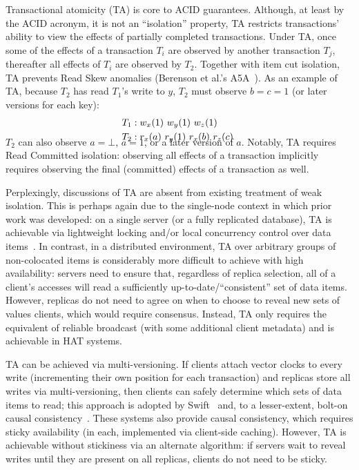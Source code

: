 Transactional atomicity (TA) is core to ACID guarantees. Although, at
least by the ACID acronym, it is not an ``isolation'' property, TA
restricts transactions' ability to view the effects of partially
completed transactions. Under TA, once some of the effects of a
transaction $T_i$ are observed by another transaction $T_j$,
thereafter all effects of $T_i$ are observed by $T_2$. Together with
item cut isolation, TA prevents Read Skew anomalies (Berenson et al.'s
A5A~\cite{ansicritique}). As an example of TA, because $T_2$ has read
$T_1$'s write to $y$, $T_2$ must observe $b=c=1$ (or later versions
for each key):
\vspace{-.5em}
\begin{align*}
\small
T_1 &: w_x(1)~w_y(1)~w_z(1)
\\T_2 &: r_x(a)~r_y(1)~r_x(b)~r_z(c)~\\[-1.5em]
\end{align*}
$T_2$ can also observe $a=\bot$, $a=1$, or a later version of
$a$. Notably, TA requires Read Committed isolation: observing all
effects of a transaction implicitly requires observing the final
(committed) effects of a transaction as well.

Perplexingly, discussions of TA are absent from existing treatment of
weak isolation. This is perhaps again due to the single-node context
in which prior work was developed: on a single server (or a fully
replicated database), TA is achievable via lightweight locking and/or
local concurrency control over data items~\cite{gstore}. In contrast,
in a distributed environment, TA over arbitrary groups of
non-colocated items is considerably more difficult to achieve with
high availability: servers need to ensure that, regardless of replica
selection, all of a client's accesses will read a sufficiently
up-to-date/``consistent'' set of data items. However, replicas do not
need to agree on when to choose to reveal new sets of values clients,
which would require consensus. Instead, TA only requires the
equivalent of reliable broadcast (with some additional client
metadata) and is achievable in HAT systems.

TA can be achieved via multi-versioning. If clients attach vector
clocks to every write (incrementing their own position for each
transaction) and replicas store all writes via multi-versioning, then
clients can safely determine which sets of data items to read; this
approach is adopted by Swift~\cite{swift} and, to a lesser-extent,
bolt-on causal consistency~\cite{bolton}. These systems also provide
causal consistency, which requires sticky availability (in each,
implemented via client-side caching). However, TA is achievable
without stickiness via an alternate algorithm: if servers wait to
reveal writes until they are present on all replicas, clients do not
need to be sticky.

